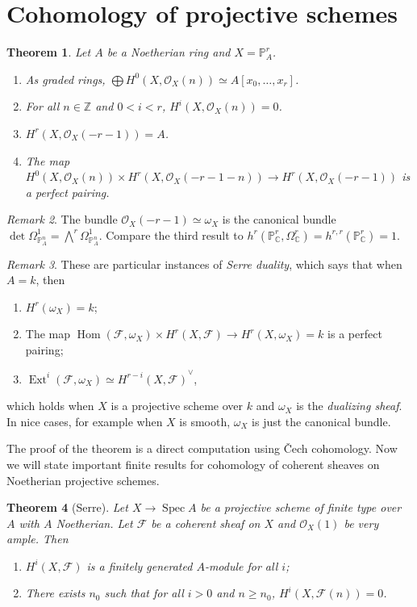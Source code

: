 \documentclass[leqno, openany]{memoir}
\newtheorem{thm}{Theorem}[section]
\theoremstyle{definition}
\theoremstyle{remark}
\newtheorem{rmk}[thm]{Remark}
\theoremstyle{plain}
\theoremstyle{definition}
\theoremstyle{remark}
\newcommand{\C}{\mathbb{C}}
\newcommand{\Z}{\mathbb{Z}}
\renewcommand{\P}{\mathbb{P}}
\newcommand{\mc}[1]{\mathcal{#1}}
\DeclareMathOperator{\Hom}{Hom}
\DeclareMathOperator{\Spec}{Spec}
\DeclareMathOperator{\Ext}{Ext}
\begin{document}
\section{Cohomology of projective schemes}%
\label{sec:cohomology_of_projective_schemes}

\begin{thm}
    Let $A$ be a Noetherian ring and $X = \P^r_A$.
    \begin{enumerate}
        \item As graded rings, $\bigoplus H^0(X, \mc{O}_X(n)) \simeq A[x_0, \ldots, x_r]$.
        \item For all $n \in \Z$ and $0 < i < r$, $H^i(X, \mc{O}_X(n)) = 0$.
        \item $H^r(X, \mc{O}_X(-r-1)) = A$.
        \item The map $H^0(X, \mc{O}_X(n)) \times H^r(X, \mc{O}_X(-r-1-n)) \to H^r(X, \mc{O}_X(-r-1))$ is a perfect pairing.
    \end{enumerate}
\end{thm}

\begin{rmk}
    The bundle $\mc{O}_X(-r-1) \simeq \omega_X$ is the canonical bundle $\det \Omega^1_{\P^n_A} = \bigwedge^r \Omega^1_{\P^n_A}$. Compare the third result to $h^r(\P^r_{\C}, \Omega^r_{\C}) = h^{r,r}(\P^r_{\C}) = 1$.
\end{rmk}

\begin{rmk}
    These are particular instances of \textit{Serre duality}, which says that when $A = k$, then 
    \begin{enumerate}
        \item $H^r(\omega_X) = k$;
        \item The map $\Hom(\mc{F}, \omega_X) \times H^r(X, \mc{F}) \to H^r(X, \omega_X) = k$ is a perfect pairing;
        \item $\Ext^i(\mc{F}, \omega_X) \simeq {H^{r-i}(X, \mc{F})}^{\vee}$,
    \end{enumerate}
    which holds when $X$ is a projective scheme over $k$ and $\omega_X$ is the \textit{dualizing sheaf}. In nice cases, for example when $X$ is smooth, $\omega_X$ is just the canonical bundle. 
\end{rmk}

The proof of the theorem is a direct computation using \v{C}ech cohomology. Now we will state important finite results for cohomology of coherent sheaves on Noetherian projective schemes.

\begin{thm}[Serre]
    Let $X \to \Spec A$ be a projective scheme of finite type over $A$ with $A$ Noetherian. Let $\mc{F}$ be a coherent sheaf on $X$ and $\mc{O}_X(1)$ be very ample. Then
    \begin{enumerate}
        \item $H^i(X, \mc{F})$ is a finitely generated $A$-module for all $i$;
        \item There exists $n_0$ such that for all $i > 0$ and $n \geq n_0$, $H^i(X, \mc{F}(n)) = 0$.
    \end{enumerate}
\end{thm}
\end{document}
